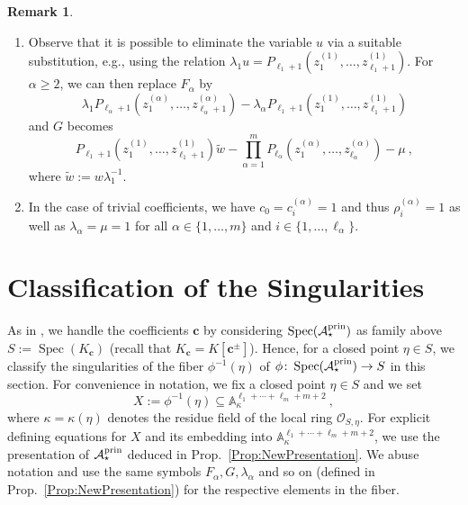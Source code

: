 \documentclass[letter,11pt]{amsart}
\renewcommand{\AA}{\ensuremath{\mathbb{A}}}
\newcommand{\KK}{\ensuremath{K}} %
\DeclareMathOperator{\Spec}{Spec}
\newcommand{\prin}{{\rm prin}}
\newcommand{\cA}{\mathcal{A}}
\renewcommand{\c}{{\boldsymbol{c}}}
\theoremstyle{theorem}
\theoremstyle{definition}
\newtheorem{Bem}[Thm]{Remark}
\newcommand{\len}{\ell}
\numberwithin{equation}{section}
\begin{document}
\begin{Bem}
	\label{Rk:eq_trivial1}
	\begin{enumerate}[(1)]
		\item 
	Observe that it is possible to eliminate the variable $ u $ via a suitable substitution,
	e.g., using the relation $ \lambda_1 u = P_{\len_1+1} ( z_1^{(1)}, \ldots, z_{\len_1 + 1}^{(1)} ) $.
	For $ \alpha \geq 2 $, we can then replace $ F_\alpha $ by 
	\[
		\lambda_1  P_{\len_\alpha+1}( z_1^{(\alpha)}, \ldots, z_{\len_\alpha + 1}^{(\alpha)} )
		- \lambda_\alpha P_{\len_1+1} ( z_1^{(1)}, \ldots, z_{\len_1 + 1}^{(1)} )
	\]
	and $ G $ becomes 
	\[
		P_{\len_1+1} ( z_1^{(1)}, \ldots, z_{\len_1 + 1}^{(1)} )
		\widetilde w - \prod_{\alpha=1}^m P_{\len_\alpha} ( z_1^{(\alpha)}, \ldots, z_{\len_\alpha}^{(\alpha)}) - \mu 
		\ ,
	\]
	where $ \widetilde w := w \lambda_1^{-1} $. 
	
	\item \label{it:trivial1}
	In the case of trivial coefficients, we have $ c_0 = c_i^{(\alpha)} = 1 $ 
	and thus $ \rho_i^{(\alpha)} = 1 $ as well as
	$ \lambda_\alpha = \mu = 1 $ 
	for all  $ \alpha \in \{ 1, \ldots, m \} $ and $ i \in \{ 1, \ldots, \len_\alpha  \} $. 
	\end{enumerate}
\end{Bem}





\section{Classification of the Singularities}
\label{Sec:Classi}


As in \cite[Section~1.4]{BFMS25},
we handle the coefficients $ \c $ by considering $ \Spec(\cA_\star^\prin) $ as family above $ S := \Spec(\KK_\c) $
(recall that $ \KK_\c = \KK [\c^\pm] $).
Hence, for a closed point $ \eta \in S $, 
we classify the singularities of the fiber 
$ \phi^{-1} (\eta ) $ of $ \phi \colon \Spec(\cA_\star^\prin) \to S $ in this section.
For convenience in notation, we fix a closed point $ \eta \in S $ and we set
\[  
	X := \phi^{-1} (\eta) 
	\subseteq \AA_\kappa^{\len_1+\cdots + \len_m+m+2} 
	\ ,
\] 
where $ \kappa = \kappa (\eta ) $ denotes the residue field of the local ring $ \mathcal{O}_{S,\eta} $.
For explicit defining equations for $ X $ and its embedding into $ \AA_\kappa^{\len_1+\cdots + \len_m+m+2} $, 
we use the presentation of $ \cA_\star^\prin $ deduced in Prop.~\ref{Prop:NewPresentation}. 
We abuse notation and use the same symbols $ F_\alpha, G, \lambda_\alpha $ and so on (defined in Prop.~\ref{Prop:NewPresentation}) for the respective elements in the fiber. 
\end{document}
